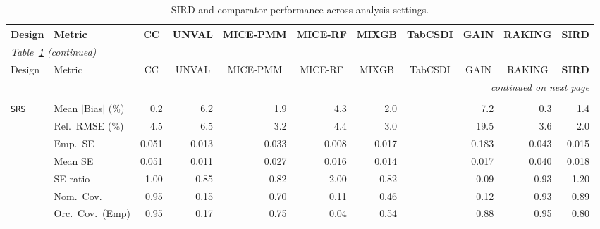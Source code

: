 \begin{landscape}
\footnotesize\setlength{\tabcolsep}{3.5pt}
\begin{longtable}{llrrrrrrrrr}
\caption{SIRD and comparator performance across analysis settings.}
\label{tab:appc_surv_SampleE} \\
\toprule
Design & Metric & \multicolumn{1}{c}{CC} & \multicolumn{1}{c}{UNVAL} & \multicolumn{1}{c}{MICE-PMM} & \multicolumn{1}{c}{MICE-RF} & \multicolumn{1}{c}{MIXGB} & \multicolumn{1}{c}{TabCSDI} & \multicolumn{1}{c}{GAIN} & \multicolumn{1}{c}{RAKING} & \multicolumn{1}{c}{\textbf{SIRD}} \\
\midrule \endfirsthead
\multicolumn{11}{l}{\footnotesize\itshape Table~\ref{tab:appc_surv_SampleE} (continued)} \\
\toprule
Design & Metric & \multicolumn{1}{c}{CC} & \multicolumn{1}{c}{UNVAL} & \multicolumn{1}{c}{MICE-PMM} & \multicolumn{1}{c}{MICE-RF} & \multicolumn{1}{c}{MIXGB} & \multicolumn{1}{c}{TabCSDI} & \multicolumn{1}{c}{GAIN} & \multicolumn{1}{c}{RAKING} & \multicolumn{1}{c}{\textbf{SIRD}} \\
\midrule \endhead
\midrule \multicolumn{11}{r}{\footnotesize\itshape continued on next page} \\
\endfoot
\bottomrule \endlastfoot
\multicolumn{11}{l}{\textbf{Continuous Phase-Two Covariates}} \\
\addlinespace[2pt]
\quad \texttt{SRS} & Mean $|$Bias$|$ (\%) & \cellcolor{rankone}0.2 & 6.2 & 1.9 & 4.3 & 2.0 &  & 7.2 & \cellcolor{ranktwo}0.3 & \cellcolor{rankthree}1.4 \\
 & Rel.\ RMSE (\%) & 4.5 & 6.5 & \cellcolor{rankthree}3.2 & 4.4 & \cellcolor{ranktwo}3.0 &  & 19.5 & 3.6 & \cellcolor{rankone}2.0 \\
 & Emp.\ SE & 0.051 & 0.013 & 0.033 & 0.008 & 0.017 &  & 0.183 & 0.043 & 0.015 \\
 & Mean SE & 0.051 & 0.011 & 0.027 & 0.016 & 0.014 &  & 0.017 & 0.040 & 0.018 \\
 & SE ratio & \cellcolor{rankone}1.00 & \cellcolor{rankthree}0.85 & 0.82 & 2.00 & 0.82 &  & 0.09 & \cellcolor{ranktwo}0.93 & 1.20 \\
 & Nom.\ Cov. & \cellcolor{rankone}0.95 & 0.15 & 0.70 & 0.11 & 0.46 &  & 0.12 & \cellcolor{ranktwo}0.93 & \cellcolor{rankthree}0.89 \\
 & Orc.\ Cov.\ (Emp) & \cellcolor{rankone}0.95 & 0.17 & 0.75 & 0.04 & 0.54 &  & \cellcolor{ranktwo}0.88 & \cellcolor{rankone}0.95 & \cellcolor{rankthree}0.80 \\

\end{longtable}
\end{landscape}
